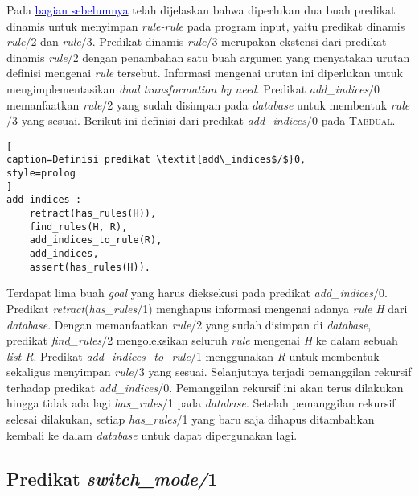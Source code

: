 Pada \hyperref[rule2to3]{\textcolor{blue}{bagian sebelumnya}} telah dijelaskan bahwa diperlukan dua buah predikat dinamis untuk menyimpan \textit{rule-rule} pada program input, yaitu predikat dinamis \textit{rule$/$}2 dan \textit{rule$/$}3. Predikat dinamis \textit{rule$/$}3 merupakan ekstensi dari predikat dinamis \textit{rule$/$}2 dengan penambahan satu buah argumen yang menyatakan urutan definisi mengenai \textit{rule} tersebut. Informasi mengenai urutan ini diperlukan untuk mengimplementasikan \textit{dual transformation by need}. Predikat \textit{add\_indices$/$}0 memanfaatkan \textit{rule$/$}2 yang sudah disimpan pada \textit{database} untuk membentuk \textit{rule$/$}3 yang sesuai. Berikut ini definisi dari predikat \textit{add\_indices$/$}0 pada \textsc{Tabdual}.
\\

\begin{lstlisting}[
caption=Definisi predikat \textit{add\_indices$/$}0,
style=prolog
]
add_indices :-
	retract(has_rules(H)),
	find_rules(H, R),
	add_indices_to_rule(R),
	add_indices,
	assert(has_rules(H)).
\end{lstlisting}

Terdapat lima buah \textit{goal} yang harus dieksekusi pada predikat \textit{add\_indices$/$}0. Predikat \textit{retract}(\textit{has\_rules$/$}1) menghapus informasi mengenai adanya \textit{rule H} dari \textit{database}. Dengan memanfaatkan \textit{rule$/$}2 yang sudah disimpan di \textit{database}, predikat \textit{find\_rules$/$}2 mengoleksikan seluruh \textit{rule} mengenai \textit{H} ke dalam sebuah \textit{list R}. Predikat \textit{add\_indices\_to\_rule$/$}1 menggunakan \textit{R} untuk membentuk sekaligus menyimpan \textit{rule$/$}3 yang sesuai. Selanjutnya terjadi pemanggilan rekursif terhadap predikat \textit{add\_indices$/$}0. Pemanggilan rekursif ini akan terus dilakukan hingga tidak ada lagi \textit{has\_rules$/$}1 pada \textit{database}. Setelah pemanggilan rekursif selesai dilakukan, setiap \textit{has\_rules$/$}1 yang baru saja dihapus ditambahkan kembali ke dalam \textit{database} untuk dapat dipergunakan lagi.

\label{subsec:mode}
\subsection{Predikat \textit{switch\_mode/}1}

